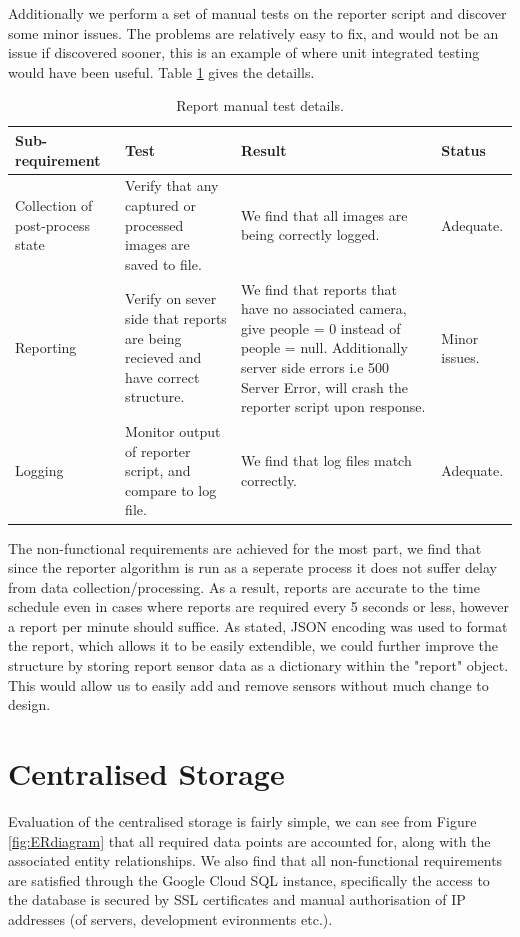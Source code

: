 \documentclass{l4proj}
\begin{document}
Additionally we perform a set of manual tests on the reporter script and discover some minor issues. The problems are relatively easy to fix, and would not be an issue if discovered sooner, this is an example of where unit integrated testing would have been useful. Table \ref{table:evalreport} gives the detaills. 
\begin{table}
\begin{tabularx}{\textwidth}{|X|X|X|X|}
\hline
\textbf{Sub-requirement} & \textbf{Test} & \textbf{Result} & \textbf{Status}\tabularnewline
\hline
Collection of post-process state  & Verify that any captured or processed images are saved to file. &  We find that all images are being correctly logged. & Adequate. \\
\hline 
Reporting & Verify on sever side that reports are being recieved and have correct structure. & We find that reports that have no associated camera, give people = 0 instead of people = null. Additionally server side errors i.e 500 Server Error, will crash the reporter script upon response. & Minor issues. \\
\hline
Logging & Monitor output of reporter script, and compare to log file. & We find that log files match correctly. & Adequate.\\
\hline
\end{tabularx}
\caption{Report manual test details.}
\label{table:evalreport}
\end{table}

The non-functional requirements are achieved for the most part, we find that since the reporter algorithm is run as a seperate process it does not suffer delay from data collection/processing. As a result, reports are accurate to the time schedule even in cases where reports are required every 5 seconds or less, however a report per minute should suffice. As stated, JSON encoding was used to format the report, which allows it to be easily extendible, we could further improve the structure by storing report sensor data as a dictionary within the "report" object. This would allow us to easily add and remove sensors without much change to design.

\section{Centralised Storage}

Evaluation of the centralised storage is fairly simple, we can see from Figure \ref{fig:ERdiagram} that all required data points are accounted for, along with the associated entity relationships. We also find that all non-functional requirements are satisfied through the Google Cloud SQL instance, specifically the access to the database is secured by SSL certificates and manual authorisation of IP addresses (of servers, development evironments etc.). 
\end{document}
